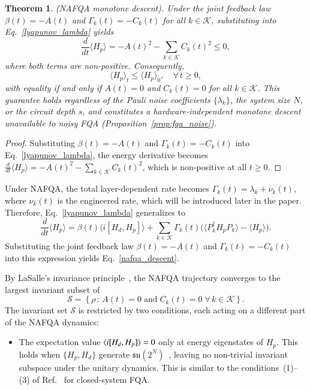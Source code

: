 \documentclass[10pt, superscriptaddress,aps,pra,twocolumn,showpacs,nofootinbib, longbibliography, notitlepage,floatfix]{revtex4-2}
\newtheorem{theorem}{Theorem}
\begin{document}
{
\begin{theorem}
\label{thm:nafqa}
(NAFQA monotone descent). Under the joint feedback law $\beta(t) = 
-A(t)$ and $\Gamma_k(t) = -C_k(t)$ for all $k \in \mathcal{K}$, 
substituting into Eq.~\eqref{lyapunov_lambda} yields
\begin{equation}
    \frac{d}{dt}\langle H_p \rangle = -A(t)^2 - \sum_{k\in\mathcal{K}} 
    C_k(t)^2 \leq 0,\label{nafqa_descent}
\end{equation}
where both terms are non-positive. Consequently,
\begin{equation}
    \langle H_p \rangle_t \leq \langle H_p \rangle_0, \quad \forall\, 
    t \geq 0,
\end{equation}
with equality if and only if $A(t) = 0$ and $C_k(t) = 0$ for all $k \in \mathcal{K}$. This guarantee holds regardless of the Pauli noise coefficients 
$\{\lambda_k\}$, the system size $N$, or the circuit depth $s$, and constitutes a hardware-independent monotone descent unavailable to noisy FQA (Proposition~\ref{prop:fqa_noise}).
\end{theorem}

\begin{proof}
Substituting $\beta(t) = -A(t)$ and $\Gamma_k(t) = -C_k(t)$ into Eq.~\eqref{lyapunov_lambda}, the energy derivative becomes $\frac{d}{dt}\langle H_p \rangle = -A(t)^2 - \sum_{k\in\mathcal{K}} C_k(t)^2$,
which is non-positive at all $t \geq 0$.
\end{proof}

Under NAFQA, the total layer-dependent rate becomes $\Gamma_k(t) = \lambda_k + \nu_k(t)$, where $\nu_k(t)$ is the engineered rate, which will be introduced later in the paper. Therefore, Eq.~\eqref{lyapunov_lambda} generalizes to
\begin{equation}
    \frac{d}{dt}\langle H_p\rangle = \beta(t)\langle 
    i[H_d,H_p]\rangle + \sum_{k\in\mathcal{K}} 
    \Gamma_k(t)\bigl(\langle P_k^\dagger H_p 
    P_k\rangle - \langle H_p\rangle\bigr).\label{eq:nafqa_update}
\end{equation}
Substituting the joint feedback law $\beta(t) = -A(t)$ and $\Gamma_k(t) = -C_k(t)$ into this expression yields Eq.~\eqref{nafqa_descent}.

By LaSalle's invariance principle~\cite{LaSalle1976}, the NAFQA trajectory converges to the largest invariant subset of
\begin{equation}
    \mathcal{S} = \left\{\rho\,:\, A(t) = 0 \;\text{and}\; C_k(t) = 0 
    \;\forall\, k\in\mathcal{K}\right\}.
\end{equation}
The invariant set $\mathcal{S}$ is restricted by two conditions, each acting on a different part of the NAFQA dynamics:
\begin{itemize}
    \item[\textbf{(C1)}] The 
    expectation value $\braket{i[H_d,H_p]} = 0$ only at energy eigenstates of $H_p$. This holds when $\{H_p, H_d\}$ generate $\mathfrak{su}(2^N)$~\cite{JURDJEVIC1972, Altafini2002}, leaving no non-trivial invariant subspace under the unitary dynamics. This is similar to the conditions~(1)--(3) of Ref.~\cite{Magann_PRA_2022} for closed-system FQA. \label{C1}
    

\end{itemize}}
\end{document}
